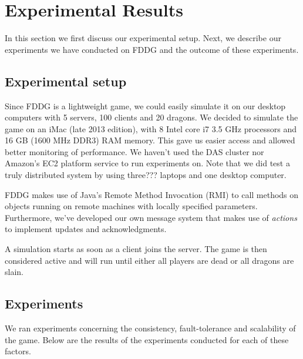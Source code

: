 \section{Experimental Results}
	In this section we first discuss our experimental setup. Next, we describe our experiments we have conducted on FDDG and the outcome of these experiments.

\subsection{Experimental setup}
\label{subsec:experimental_setup}

	Since FDDG is a lightweight game, we could easily simulate it on our desktop computers with 5 servers, 100 clients and 20 dragons. 
	We decided to simulate the game on an iMac (late 2013 edition), with 8 Intel core i7 3.5 GHz processors and 16 GB (1600 MHz DDR3) RAM memory. 
	This gave us easier access and allowed better monitoring of performance.
	We haven't used the DAS cluster nor Amazon's EC2 platform service to run experiments on. 
	Note that we did test a truly distributed system by using three??? laptops and one desktop computer.
	
	FDDG makes use of Java's Remote Method Invocation (RMI) to call methods on objects running on remote machines with locally specified parameters. 
	Furthermore, we've developed our own message system that makes use of \emph{actions} to implement updates and acknowledgments.
	
	A simulation starts as soon as a client joins the server. The game is then considered active and will run until either all players are dead or all dragons are slain.


\subsection{Experiments}
	We ran experiments concerning the consistency, fault-tolerance and scalability of the game. Below are the results of the experiments conducted for each of these factors.

